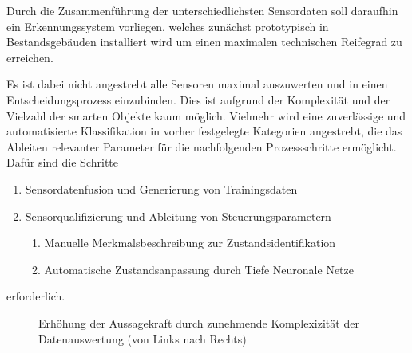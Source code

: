Durch die Zusammenführung der unterschiedlichsten Sensordaten soll daraufhin ein Erkennungssystem vorliegen, welches zunächst prototypisch in Bestandsgebäuden installiert wird um einen maximalen technischen Reifegrad zu erreichen. 

Es ist dabei nicht angestrebt alle Sensoren maximal auszuwerten und in einen Entscheidungsprozess einzubinden. Dies ist aufgrund der Komplexität und der Vielzahl der smarten Objekte kaum möglich. Vielmehr wird eine zuverlässige und automatisierte Klassifikation in vorher festgelegte Kategorien angestrebt, die das Ableiten relevanter Parameter für die nachfolgenden Prozessschritte ermöglicht. Dafür sind die Schritte 

\begin{enumerate}
    \itemsep0em
    \item Sensordatenfusion und Generierung von Trainingsdaten
    \item Sensorqualifizierung und Ableitung von Steuerungsparametern
    \begin{enumerate}
        \item Manuelle Merkmalsbeschreibung zur Zustandsidentifikation
        \item Automatische Zustandsanpassung durch Tiefe Neuronale Netze
    \end{enumerate}
\end{enumerate}

erforderlich.

\begin{figure}[htbp]
    \centering
    \caption{\label{fig-ki-heizen}Erhöhung der Aussagekraft durch zunehmende Komplexizität der Datenauswertung (von Links nach Rechts)}
\end{figure}

